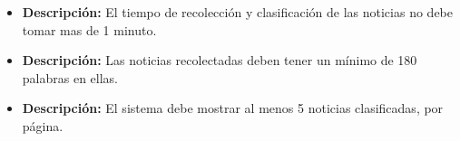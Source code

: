 


    \begin{itemize}
      \item \textbf{Descripción:} El tiempo de recolección y clasificación de las noticias no debe tomar mas de 1 minuto.\\
    \end{itemize}

    \begin{itemize}
     \item \textbf{Descripción:} Las noticias recolectadas deben tener un mínimo de 180 palabras en ellas.\\
    \end{itemize}

    \begin{itemize}
      \item \textbf{Descripción:} El sistema debe mostrar al menos 5 noticias clasificadas, por página.\\
    \end{itemize}

